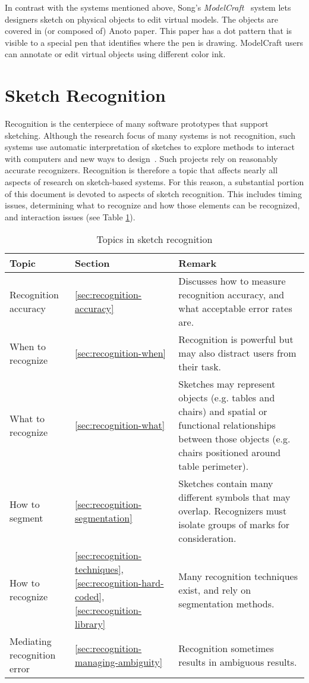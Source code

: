 In contrast with the systems mentioned above, Song's
\textit{ModelCraft}~\cite{song-modelcraft} system lets designers
sketch on physical objects to edit virtual models. The objects are
covered in (or composed of) Anoto paper. This paper has a dot pattern
that is visible to a special pen that identifies where the pen is
drawing. ModelCraft users can annotate or edit virtual objects using
different color ink. 

\section{Sketch Recognition}

Recognition is the centerpiece of many software prototypes that
support sketching. Although the research focus of many systems is not
recognition, such systems use automatic interpretation of sketches to
explore methods to interact with computers and new ways to
design~\cite{gross-boe,grundy-maramasketch,lin-denim}. Such projects
rely on reasonably accurate recognizers. Recognition is therefore a
topic that affects nearly all aspects of research on sketch-based
systems. For this reason, a substantial portion of this document is
devoted to aspects of sketch recognition. This includes timing issues,
determining what to recognize and how those elements can be
recognized, and interaction issues (see Table
\ref{tab:recognition-topics}).

\begin{table}
\begin{tabular}{p{5cm}| p{2cm} | p{8.5cm}}
\textbf{Topic} & \textbf{Section} & \textbf{Remark} \\
\hline \hline
Recognition accuracy &
\ref{sec:recognition-accuracy} & Discusses how to measure recognition 
accuracy, and what acceptable error rates are.
\\ \hline
When to recognize & 
\ref{sec:recognition-when} &
Recognition is powerful but may also distract users from their
task. 
\\ \hline
What to recognize &
\ref{sec:recognition-what} & Sketches may represent objects
(e.g. tables and chairs) and spatial or functional relationships
between those objects (e.g. chairs positioned around table perimeter).
\\ \hline
How to segment &
\ref{sec:recognition-segmentation} &
Sketches contain many different symbols that may overlap. Recognizers
must isolate groups of marks for consideration.
\\ \hline
How to recognize &

\ref{sec:recognition-techniques}, \ref{sec:recognition-hard-coded},
\ref{sec:recognition-library} &

Many recognition techniques exist, and rely on segmentation
methods. \\ \hline

Mediating recognition error &
\ref{sec:recognition-managing-ambiguity} &
Recognition sometimes results in ambiguous results.
\\ \hline

\end{tabular}
\caption{Topics in sketch recognition}
\label{tab:recognition-topics}
\end{table}

